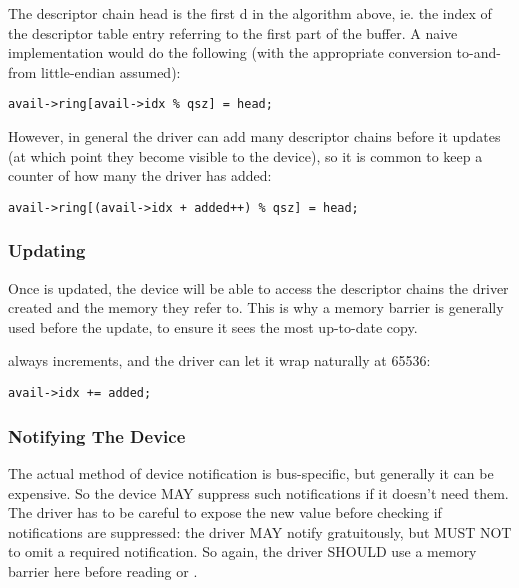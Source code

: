 The descriptor chain head is the first d in the algorithm
above, ie. the index of the descriptor table entry referring to the first
part of the buffer.  A naive implementation would do the following (with the
appropriate conversion to-and-from little-endian assumed):

\begin{lstlisting}
avail->ring[avail->idx % qsz] = head;
\end{lstlisting}

However, in general the driver can add many descriptor chains before it updates
 (at which point they become visible to the
device), so it is common to keep a counter of how many the driver has added:

\begin{lstlisting}
avail->ring[(avail->idx + added++) % qsz] = head;
\end{lstlisting}

\subsubsection{Updating }\label{sec:General Initialization And Device Operation / Device Operation / Supplying Buffers to The Device / Updating idx}

Once  is updated, the device will
be able to access the descriptor chains the driver created and the
memory they refer to. This is why a memory barrier is generally
used before the  update, to ensure it sees the most up-to-date
copy.

 always increments, and the driver can let it wrap naturally at
65536:

\begin{lstlisting}
avail->idx += added;
\end{lstlisting}

\subsubsection{Notifying The Device}\label{sec:General Initialization And Device Operation / Device Operation / Supplying Buffers to The Device / Notifying The Device}

The actual method of device notification is bus-specific, but generally
it can be expensive.  So the device MAY suppress such notifications if it
doesn't need them.  The driver has to be careful to expose the new 
value before checking if notifications are suppressed: the driver MAY notify
gratuitously, but MUST NOT to omit a required notification. So again,
the driver SHOULD use a memory barrier here before reading  or
.


